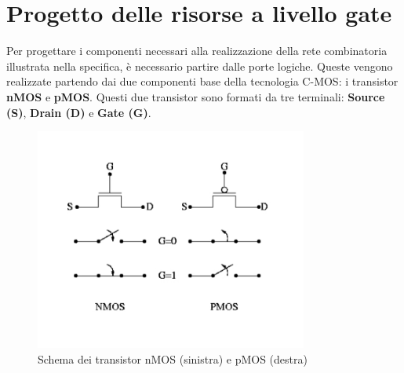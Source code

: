 \documentclass[10pt]{article}
\begin{document}
\section{Progetto delle risorse a livello gate}
Per progettare i componenti necessari alla realizzazione della rete combinatoria illustrata nella specifica, è necessario
partire dalle porte logiche. Queste vengono realizzate partendo dai due componenti base della tecnologia C-MOS: i transistor \textbf{nMOS} e \textbf{pMOS}.
Questi due transistor sono formati da tre terminali: \textbf{Source (S)}, \textbf{Drain (D)} e \textbf{Gate (G)}.

\begin{figure}[H]
    \centering
    \includegraphics[width=0.8\textwidth]{transistors}
    \caption{Schema dei transistor nMOS (sinistra) e pMOS (destra)}
    \label{ }    
\end{figure}
\end{document}

